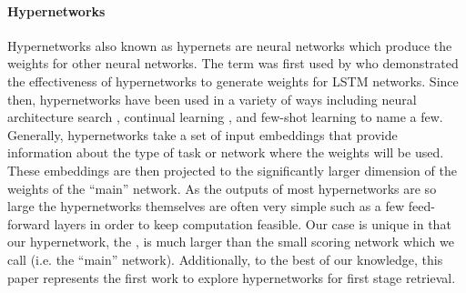 \paragraph{\textbf{Hypernetworks}}
Hypernetworks also known as hypernets are neural networks which produce the weights for other neural networks. The term was first used by \citet{HyperNetworks} who demonstrated the effectiveness of hypernetworks to generate weights for LSTM networks. Since then, hypernetworks have been used in a variety of ways including neural architecture search \cite{GraphHyperNetworksNeuralArchitectureSearch}, continual learning \cite{ContinualLearningWithHypernetworks}, and few-shot learning \cite{MetaLearningWithLatentEmbeddingOptimization, HyperShot} to name a few. Generally, hypernetworks take a set of input embeddings that provide information about the type of task or network where the weights will be used. These embeddings are then projected to the significantly larger dimension of the weights of the ``main'' network. As the outputs of most hypernetworks are so large the hypernetworks themselves are often very simple such as a few feed-forward layers in order to keep computation feasible. Our case is unique in that our hypernetwork, the \name{}, is much larger than the small scoring network which we call \mininame{} (i.e. the ``main'' network). Additionally, to the best of our knowledge, this paper represents the first work to explore hypernetworks for first stage retrieval.